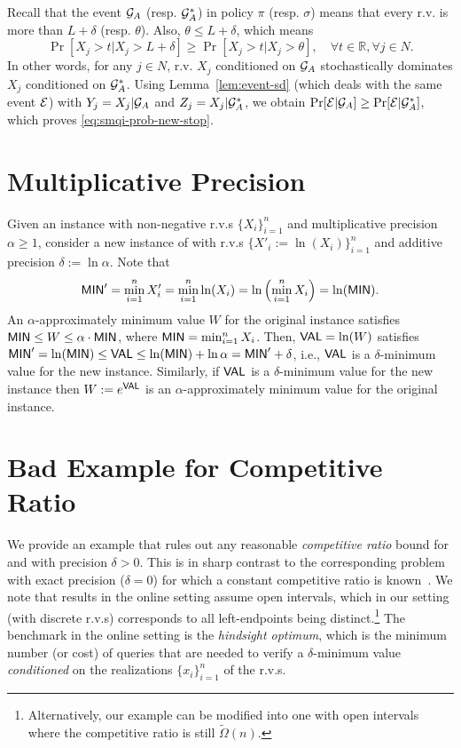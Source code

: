 \documentclass[11pt]{article}
\theoremstyle{remark}
\theoremstyle{plain}
\theoremstyle{remark}
\begin{document}
Recall that the event ${\cal G}_A$ (resp. ${\cal G}^*_A$) in policy $\pi$ (resp. $\sigma$) means that every  r.v. is more than $L+\delta$ (resp. $\theta$). Also, $\theta \le L+\delta$, which means 
$$\Pr[X_j > t | X_j >L+\delta] \ge \Pr[X_j > t | X_j >\theta], \quad \forall t\in \mathbb{R} , \forall j\in N. $$
In other words, for any $j\in N$, r.v. $X_j$ conditioned on ${\cal G}_A$ stochastically dominates $X_j$ conditioned on ${\cal G}^*_A$.  Using Lemma~\ref{lem:event-sd} (which deals with the same event ${\cal E}$) with $Y_j = X_j | {\cal G}_A$ and $Z_j = X_j | {\cal G}^*_A$, we obtain $\Pr[{\cal E}  | {\cal G}_A] \ge \Pr[{\cal E} | {\cal G}^*_A]$, which proves \eqref{eq:smqi-prob-new-stop}.




 






\appendix
\section{Multiplicative Precision}\label{app:multiplicative}
Given an instance with non-negative r.v.s $\{X_i\}_{i=1}^n$ and multiplicative precision $\alpha \ge 1$, consider a new instance of \smq with r.v.s $\{X'_i := \ln(X_i)\}_{i=1}^n$ and additive precision $\delta:= \ln \alpha$. Note that 
$${\sf MIN}'=\min_{i=1}^n X'_i=\min_{i=1}^n \ln(X_i) = \ln\left(\min_{i=1}^n X_i\right)=\ln ({\sf MIN}).$$
An  $\alpha$-approximately minimum value $W$ for the original instance satisfies ${\sf MIN}\le W\le \alpha\cdot {\sf MIN}$, where ${\sf MIN}=\min_{i=1}^n X_i$. Then,  ${\sf VAL}=\ln(W)$ satisfies
${\sf MIN}' = \ln ({\sf MIN}) \le {\sf VAL} \le \ln({\sf MIN}) + \ln \alpha = {\sf MIN}'+\delta$, i.e., ${\sf VAL}$ is a $\delta$-minimum value for the new instance. Similarly, if ${\sf VAL}$ is a $\delta$-minimum value for the new instance then $W:=e^{{\sf VAL}}$ is an $\alpha$-approximately minimum value  for the original instance.

\section{Bad Example for Competitive Ratio}\label{app:bad-cr}
We provide an example that rules out any reasonable {\em competitive ratio} bound for \smq and \smqi with precision $\delta>0$. This is in sharp contrast to the corresponding problem with exact precision ($\delta=0$)  for which a constant competitive ratio is known~\cite{kahan1991model}.  We note that results in the online setting assume open intervals, which in our setting (with discrete r.v.s)  corresponds to all left-endpoints being distinct.\footnote{Alternatively, our example can be modified into one with open intervals where the competitive ratio is still $\tilde\Omega(n)$.}  The benchmark in the online setting is the {\em hindsight optimum}, which is the minimum number (or cost) of queries that are needed to verify a $\delta$-minimum value  {\em conditioned} on the realizations $\{x_i\}_{i=1}^n$ of the r.v.s.  
\end{document}
